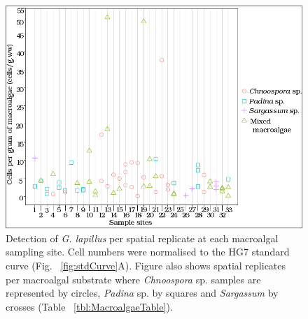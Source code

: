 \documentclass[12pt]{article}
\begin{document}
\begin{figure} 
\includegraphics[scale=.75]{Hero_qpcr-figs/Fig5_Env-sample-sites-plot_nov18.png}
\caption{Detection of \emph{G. lapillus} per spatial replicate at each macroalgal sampling site. Cell numbers were normalised to the HG7 standard curve (Fig. ~\ref{fig:stdCurve}A). Figure also shows spatial replicates per macroalgal substrate where \emph{Chnoospora} sp. samples are represented by circles, \emph{Padina} sp. by squares and \textit{Sargassum} by crosses (Table ~\ref{tbl:MacroalgaeTable}).} 
\label{fig:envHG7}
\end{figure} 
\FloatBarrier


\newpage
\end{document}
